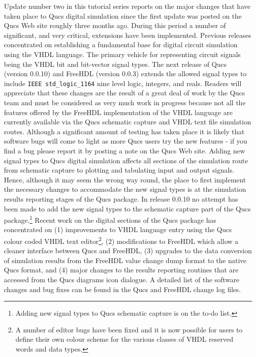 
Update number two in this tutorial series reports on the major changes that have taken place to Qucs digital simulation since the first update was posted on the Qucs Web site roughly three months ago.  During this period a number of significant, and very critical, extensions have been implemented. Previous releases concentrated on establishing a fundamental base for digital circuit simulation using the VHDL language. The primary vehicle for representing circuit signals being the VHDL bit and bit-vector signal types. The next release of Qucs (version 0.0.10) and FreeHDL (version 0.0.3) extends the allowed signal types to include \verb|IEEE std_logic_1164| nine level logic, integers, and reals. Readers will appreciate that these changes are the result of a great deal of work by the Qucs team and must be considered as very much work in progress because not all the features offered by the FreeHDL implementation of the VHDL language are currently available via the Qucs schematic capture and VHDL text file simulation routes. Although a significant amount of testing has taken place it is likely that software bugs will come to light as more Qucs users try the new features - if you find a bug please report it by posting a note on the Qucs Web site. Adding new signal types to Qucs digital simulation affects all sections of the simulation route from schematic capture to plotting and tabulating input and output signals.  Hence, although it may seem the wrong way round, the place to first implement the necessary changes to accommodate the new signal types is at the simulation results reporting stages of the Qucs package.  In release 0.0.10 no attempt has been made to add the new signal types to the schematic capture part of the Qucs package.\footnote{Adding new signal types to Qucs schematic capture is on the to-do list.}   Recent work on the digital sections of the Qucs package has concentrated on (1) improvements to VHDL language entry using the Qucs colour coded VHDL text editor\footnote{A number of editor bugs have been fixed and it is now possible for users to define their own colour scheme for the various classes of VHDL reserved words and data types.}, (2) modifications to FreeHDL which allow a cleaner interface between Qucs and FreeHDL, (3) upgrades to the data conversion of simulation results from the FreeHDL value change dump format to the native Qucs format, and (4) major changes to the results reporting routines that are accessed from the Qucs diagrams icon dialogue.  A detailed list of the software changes and bug fixes can be found in the Qucs and FreeHDL change log files.


